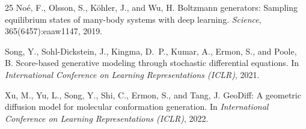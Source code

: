 \documentclass[11pt]{article}
\begin{document}
\begin{thebibliography}{25}
Noé, F., Olsson, S., Köhler, J., and Wu, H.
\newblock Boltzmann generators: Sampling equilibrium states of many-body systems with deep learning.
\newblock \emph{Science}, 365(6457):eaaw1147, 2019.

Song, Y., Sohl-Dickstein, J., Kingma, D.~P., Kumar, A., Ermon, S., and Poole, B.
\newblock Score-based generative modeling through stochastic differential equations.
\newblock In \emph{International Conference on Learning Representations (ICLR)}, 2021.

Xu, M., Yu, L., Song, Y., Shi, C., Ermon, S., and Tang, J.
\newblock GeoDiff: A geometric diffusion model for molecular conformation generation.
\newblock In \emph{International Conference on Learning Representations (ICLR)}, 2022.

\end{thebibliography}

\end{document}
